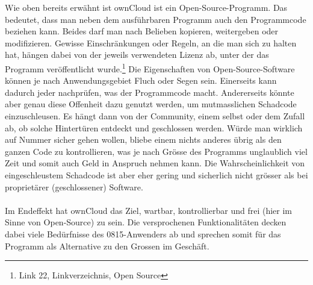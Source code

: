 Wie oben bereits erwähnt ist ownCloud ist ein Open-Source-Programm. Das bedeutet, dass man neben dem ausführbaren Programm auch den Programmcode beziehen kann. Beides darf man nach Belieben kopieren, weitergeben oder modifizieren. Gewisse Einschränkungen oder Regeln, an die man sich zu halten hat, hängen dabei von der jeweils verwendeten Lizenz ab, unter der das Programm veröffentlicht wurde.\footnote{Link 22, Linkverzeichnis, Open Source}
Die Eigenschaften von Open-Source-Software können je nach Anwendungsgebiet Fluch oder Segen sein. Einerseits kann dadurch jeder nachprüfen, was der Programmcode macht. Andererseits könnte aber genau diese Offenheit dazu genutzt werden, um mutmasslichen Schadcode einzuschleusen. Es hängt dann von der Community, einem selbst oder dem Zufall ab, ob solche Hintertüren entdeckt und geschlossen werden. Würde man wirklich auf Nummer sicher gehen wollen, bliebe einem nichts anderes übrig als den ganzen Code zu kontrollieren, was je nach Grösse des Programms unglaublich viel Zeit und somit auch Geld in Anspruch nehmen kann. Die Wahrscheinlichkeit von eingeschleustem Schadcode ist aber eher gering und sicherlich nicht grösser als bei proprietärer (geschlossener) Software.
\\
\\
Im Endeffekt hat ownCloud das Ziel, wartbar, kontrollierbar und frei (hier im Sinne von Open-Source) zu sein. Die versprochenen Funktionalitäten decken dabei viele Bedürfnisse des 0815-Anwenders ab und sprechen somit für das Programm als Alternative zu den Grossen im Geschäft.

